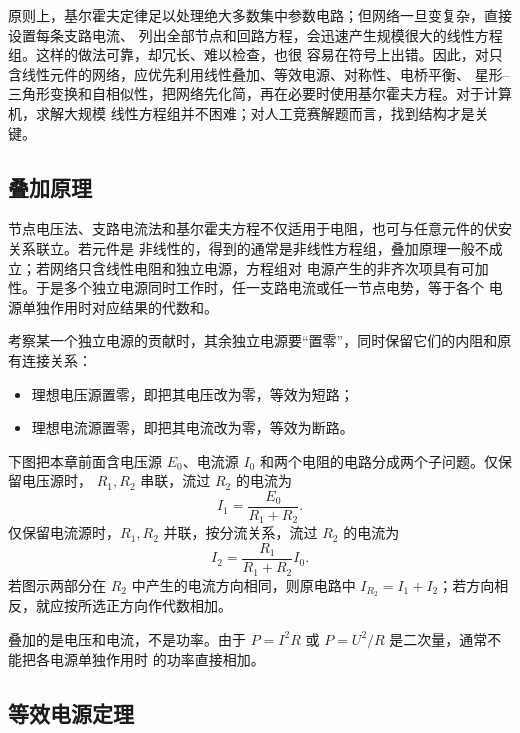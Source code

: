 {原则上，基尔霍夫定律足以处理绝大多数集中参数电路；但网络一旦变复杂，直接设置每条支路电流、
列出全部节点和回路方程，会迅速产生规模很大的线性方程组。这样的做法可靠，却冗长、难以检查，也很
容易在符号上出错。因此，对只含线性元件的网络，应优先利用线性叠加、等效电源、对称性、电桥平衡、
星形--三角形变换和自相似性，把网络先化简，再在必要时使用基尔霍夫方程。对于计算机，求解大规模
线性方程组并不困难；对人工竞赛解题而言，找到结构才是关键。


\subsection{叠加原理}


节点电压法、支路电流法和基尔霍夫方程不仅适用于电阻，也可与任意元件的伏安关系联立。若元件是
非线性的，得到的通常是非线性方程组，叠加原理一般不成立；若网络只含线性电阻和独立电源，方程组对
电源产生的非齐次项具有可加性。于是多个独立电源同时工作时，任一支路电流或任一节点电势，等于各个
电源单独作用时对应结果的代数和。

考察某一个独立电源的贡献时，其余独立电源要“置零”，同时保留它们的内阻和原有连接关系：

\begin{itemize}
  \item 理想电压源置零，即把其电压改为零，等效为短路；
  \item 理想电流源置零，即把其电流改为零，等效为断路。
\end{itemize}

下图把本章前面含电压源 $E_0$、电流源 $I_0$ 和两个电阻的电路分成两个子问题。仅保留电压源时，
$R_1,R_2$ 串联，流过 $R_2$ 的电流为
\[
  I_1=\frac{E_0}{R_1+R_2}.
\]
仅保留电流源时，$R_1,R_2$ 并联，按分流关系，流过 $R_2$ 的电流为
\[
  I_2=\frac{R_1}{R_1+R_2}I_0.
\]
若图示两部分在 $R_2$ 中产生的电流方向相同，则原电路中
$I_{R_2}=I_1+I_2$；若方向相反，就应按所选正方向作代数相加。

\par\noindent\begin{minipage}{\linewidth}
\superpositionFigure
{}
\end{minipage}\par\medskip

叠加的是电压和电流，不是功率。由于 $P=I^2R$ 或 $P=U^2/R$ 是二次量，通常不能把各电源单独作用时
的功率直接相加。


\subsection{等效电源定理}


}
